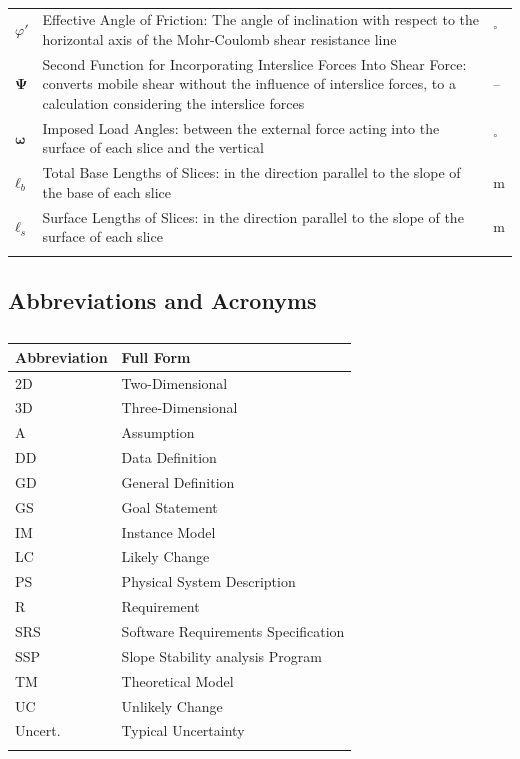 \documentclass[12pt]{article}
\begin{document}
\begin{longtabu}{l X[l] l}
\\
$φ'$ & Effective Angle of Friction: The angle of inclination with respect to the horizontal axis of the Mohr-Coulomb shear resistance line & ${}^{\circ}$
\\
$\mathbf{Ψ}$ & Second Function for Incorporating Interslice Forces Into Shear Force: converts mobile shear without the influence of interslice forces, to a calculation considering the interslice forces & --
\\
$\mathbf{ω}$ & Imposed Load Angles: between the external force acting into the surface of each slice and the vertical & ${}^{\circ}$
\\
${\mathbf{ℓ}_{b}}$ & Total Base Lengths of Slices: in the direction parallel to the slope of the base of each slice & m
\\
${\mathbf{ℓ}_{s}}$ & Surface Lengths of Slices: in the direction parallel to the slope of the surface of each slice & m
\\
\bottomrule
\caption{}
\label{Table:ToS}
\end{longtabu}
\subsection{Abbreviations and Acronyms}
\label{Sec:TAbbAcc}
\begin{longtable}{l l}
\toprule
\textbf{Abbreviation} & \textbf{Full Form}
\\
\midrule
\endhead
2D & Two-Dimensional
\\
3D & Three-Dimensional
\\
A & Assumption
\\
DD & Data Definition
\\
GD & General Definition
\\
GS & Goal Statement
\\
IM & Instance Model
\\
LC & Likely Change
\\
PS & Physical System Description
\\
R & Requirement
\\
SRS & Software Requirements Specification
\\
SSP & Slope Stability analysis Program
\\
TM & Theoretical Model
\\
UC & Unlikely Change
\\
Uncert. & Typical Uncertainty
\\
\bottomrule
\caption{}
\label{Table:TAbbAcc}
\end{longtable}
\end{document}
